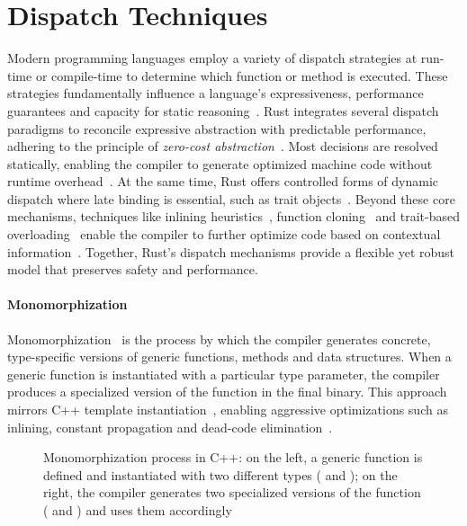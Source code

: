 
\section{Dispatch Techniques}\label{sec:dispatch}
Modern programming languages employ a variety of dispatch strategies at run-time or compile-time to determine which function or method is executed.
These strategies fundamentally influence a language's expressiveness, performance guarantees and capacity for static reasoning~\cite{Cardelli85,Milner78}.
Rust integrates several dispatch paradigms to reconcile expressive abstraction with predictable performance, adhering to the principle of \textit{zero-cost abstraction}~\cite{Steele90,Stroustrup05}.
Most decisions are resolved statically, enabling the compiler to generate optimized machine code without runtime overhead~\cite{Aho06,Cytron91}.
At the same time, Rust offers controlled forms of dynamic dispatch where late binding is essential, such as trait objects~\cite{Matsakis14}.
Beyond these core mechanisms, techniques like inlining heuristics~\cite{Cavazos05}, function cloning~\cite{Das03} and trait-based overloading~\cite{Stuckey05} enable the compiler to further optimize code based on contextual information~\cite{Chang97,Wegman85}.
Together, Rust's dispatch mechanisms provide a flexible yet robust model that preserves safety and performance.

\paragraph{Monomorphization}
Monomorphization~\cite{Griesemer2020FeatherweightG} is the process by which the compiler generates concrete, type-specific versions of generic functions, methods and data structures.
When a generic function is instantiated with a particular type parameter, the compiler produces a specialized version of the function in the final binary.
This approach mirrors C++ template instantiation~\cite{Vandevoorde02}, enabling aggressive optimizations such as inlining, constant propagation and dead-code elimination~\cite{Aho06,Wegman85,Cytron91}.
\begin{figure}[htb!]
	\centering
	\begin{minipage}{0.49\textwidth}
		\centering
	\end{minipage}
	\hfill
	\begin{minipage}{0.49\textwidth}
		\centering
	\end{minipage}
	\captionsetup{type=listing,skip=2pt}
	\caption{Monomorphization process in C++: on the left, a generic function  is defined and instantiated with two different types ( and ); on the right, the compiler generates two specialized versions of the function ( and ) and uses them accordingly}
	\label{fig:monomorphization}
\end{figure}


